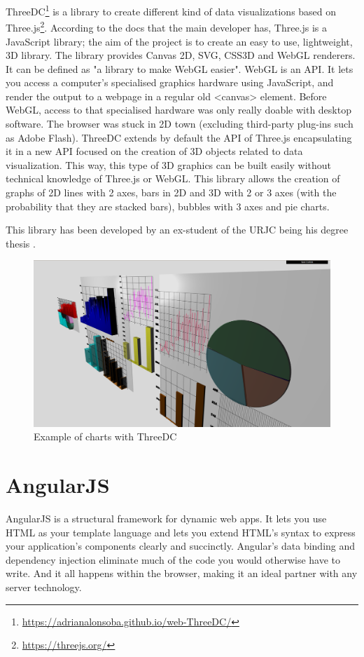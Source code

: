 \documentclass[a4paper, 12pt]{book}
\begin{document}
ThreeDC\footnote{\url{https://adrianalonsoba.github.io/web-ThreeDC/}} is a library to create different kind of data visualizations based on Three.js\footnote{\url{https://threejs.org/}}. According to the docs that the main developer has, Three.js is a JavaScript library; the aim of the project is to create an easy to use, lightweight, 3D library. The library provides Canvas 2D, SVG, CSS3D and WebGL renderers. It can be defined as "a library to make WebGL easier". 
WebGL is an API. It lets you access a computer's specialised graphics hardware using JavaScript, and render the output to a webpage in a regular old <canvas> element. Before WebGL, access to that specialised hardware was only really doable with desktop software. The browser was stuck in 2D town (excluding third-party plug-ins such as Adobe Flash).
ThreeDC extends by default the API of Three.js encapsulating it in a new API focused on the creation of 3D objects related to data visualization. This way, this type of 3D graphics can be built easily without technical knowledge of Three.js or WebGL. This library allows the creation of graphs of 2D lines with 2 axes, bars in 2D and 3D with 2 or 3 axes (with the probability that they are stacked bars), bubbles with 3 axes and pie charts.

This library has been developed by an ex-student of the URJC being his degree thesis \cite{Threedcmemoria}.

\begin{figure}[H]
  \centering
  \includegraphics[width=16cm, keepaspectratio]{img/context/threedc.png}
  \caption{Example of charts with ThreeDC}
  \label{fig:pluginhtml}
\end{figure}

\section{AngularJS}
\label{sec:angular}
AngularJS is a structural framework for dynamic web apps. It lets you use HTML as your template language and lets you extend HTML's syntax to express your application's components clearly and succinctly. Angular's data binding and dependency injection eliminate much of the code you would otherwise have to write. And it all happens within the browser, making it an ideal partner with any server technology.
\end{document}
